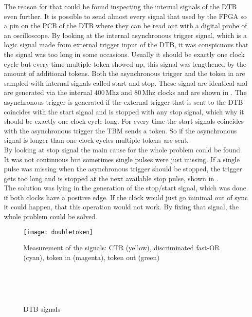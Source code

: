 The reason for that could be found inspecting the internal signals of the \ac{DTB} even further. It is possible to send almost every signal that used by the \ac{FPGA} so a pin on the \ac{PCB} of the \ac{DTB} where they can be read out with a digital probe of an oscilloscope. By looking at the internal asynchronous trigger signal, which is a logic signal made from external trigger input of the \ac{DTB}, it was conspicuous that the signal was too long in some occasions. Usually it should be exactly one clock cycle but every time multiple token showed up, this signal was lengthened by the amount of additional tokens. Both the asynchronous trigger and the token in are sampled with internal signals called start and stop. These signal are identical and are generated via the internal $400\,$Mhz and $80\,$Mhz clocks and are shown in . The asynchronous trigger is generated if the external trigger that is sent to the \ac{DTB} coincides with the start signal and is stopped with any stop signal, which why it should be exactly one clock cycle long. For every time the start signals coincides with the asynchronous trigger the \ac{TBM} sends a token. So if the asynchronous signal is longer than one clock cycles multiple tokens are sent.\\
By looking at stop signal the main cause for the whole problem could be found. It was not continuous but sometimes single pulses were just missing. If a single pulse was missing when the asynchronous trigger should be stopped, the trigger gets too long and is stopped at the next available stop pulse, shown in .\\
The solution was lying in the generation of the stop/start signal, which was done if both clocks have a positive edge. If the clock would just go minimal out of sync it could happen, that this operation would not work. By fixing that signal, the whole problem could be solved.
\begin{figure}[ht]
	\centering
	\texttt{[image: doubletoken]}
	\caption{Measurement of the signals: \ac{CTR} (yellow), discriminated fast-OR (cyan), token in (magenta), token out (green)}
	\label{p2tok}
\end{figure}\no
\begin{figure}[ht]
	\centering
	\\
	\\
	\\
	\caption{\ac{DTB} signals}
	\label{psigdtb}
\end{figure}\no
